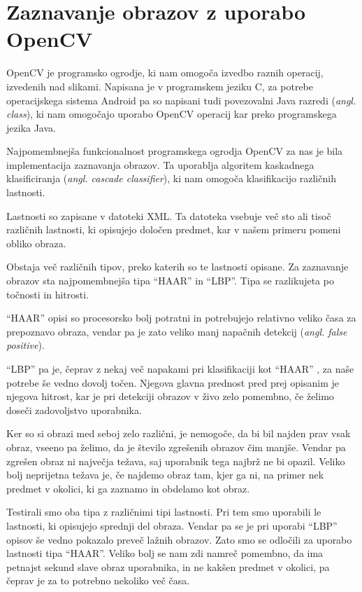 \section{Zaznavanje obrazov z uporabo OpenCV}
OpenCV je programsko ogrodje, ki nam omogoča izvedbo raznih operacij, izvedenih nad slikami.
Napisana je v programskem jeziku C, za potrebe operacijskega sistema Android pa so napisani tudi povezovalni Java razredi (\textit{angl. class}), ki nam
omogočajo uporabo OpenCV operacij kar preko programskega jezika Java.

Najpomembnejša funkcionalnost programskega ogrodja OpenCV za nas je bila implementacija zaznavanja obrazov. Ta uporablja algoritem kaskadnega klasificiranja (\textit{angl. cascade classifier}), ki nam omogoča
klasifikacijo različnih lastnosti.

Lastnosti so zapisane v datoteki XML. Ta datoteka vsebuje več sto ali tisoč različnih lastnosti, ki opisujejo določen predmet, kar v našem primeru pomeni obliko obraza.

Obstaja več različnih tipov, preko katerih so te lastnosti opisane. Za zaznavanje obrazov sta najpomembnejša tipa ``HAAR'' in ``LBP''. Tipa se razlikujeta po točnosti in hitrosti.

``HAAR'' opisi so procesorsko bolj potratni in potrebujejo relativno veliko časa za prepoznavo obraza, vendar pa je zato veliko manj napačnih detekcij (\textit{angl. false positive}).

``LBP'' pa je, čeprav z nekaj več napakami pri klasifikaciji kot ``HAAR'' , za naše potrebe še vedno dovolj točen. Njegova glavna prednost pred prej opisanim je  njegova hitrost, kar je pri detekciji obrazov v živo zelo pomembno, če želimo doseči zadovoljstvo uporabnika.

Ker so si obrazi med seboj zelo različni, je nemogoče, da bi bil najden prav vsak obraz, vseeno pa želimo, da je število zgrešenih obrazov čim manjše. Vendar pa zgrešen obraz ni največja težava, saj uporabnik tega najbrž ne bi opazil. Veliko bolj neprijetna težava je, če najdemo obraz tam, kjer ga ni, na primer nek predmet v okolici, ki ga zaznamo in obdelamo kot obraz.

Testirali smo oba tipa z različnimi tipi lastnosti. Pri tem smo uporabili le lastnosti, ki opisujejo sprednji del obraza. Vendar pa se je pri uporabi ``LBP'' opisov še vedno pokazalo preveč lažnih obrazov. Zato smo se odločili
za uporabo lastnosti tipa ``HAAR''. Veliko bolj se nam zdi namreč pomembno, da ima petnajst sekund slave obraz uporabnika, in ne kakšen predmet v okolici, pa čeprav je za to potrebno nekoliko več časa.

